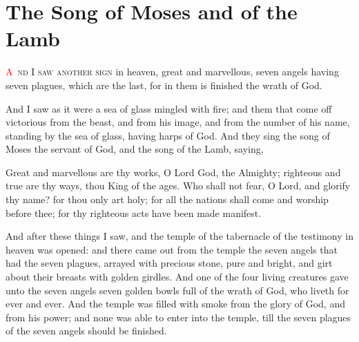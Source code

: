 
\chapter{The Song of Moses and of the Lamb}
\lettrine[lines=3,slope=-0.5em]{\textcolor{red}{A}}{\ nd I saw another sign} in heaven, great and marvellous, seven angels having seven plagues, which are the last, for in them is finished the wrath of God.

 And I saw as it were a sea of glass mingled with fire; and them that come off victorious from the beast, and from his image, and from the number of his name, standing by the sea of glass, having harps of God. 
 And they sing the song of Moses the servant of God, and the song of the Lamb, saying,

Great and marvellous are thy works, O Lord God, the Almighty; righteous and true are thy ways, thou King of the ages. 
 Who shall not fear, O Lord, and glorify thy name? for thou only art holy; for all the nations shall come and worship before thee; for thy righteous acts have been made manifest.

 And after these things I saw, and the temple of the tabernacle of the testimony in heaven was opened: 
 and there came out from the temple the seven angels that had the seven plagues, arrayed with precious stone, pure and bright, and girt about their breasts with golden girdles. 
 And one of the four living creatures gave unto the seven angels seven golden bowls full of the wrath of God, who liveth for ever and ever. 
 And the temple was filled with smoke from the glory of God, and from his power; and none was able to enter into the temple, till the seven plagues of the seven angels should be finished.